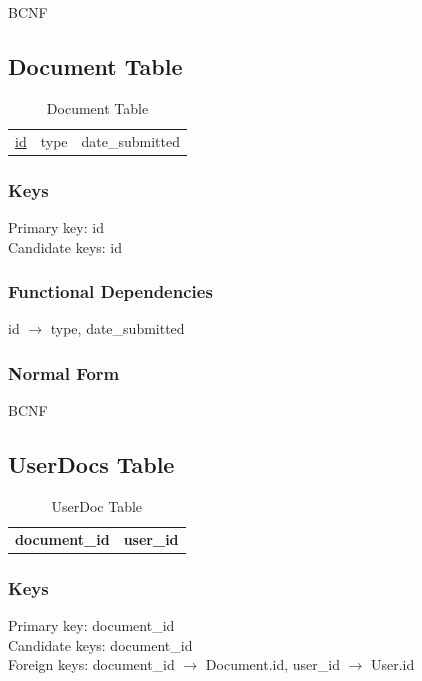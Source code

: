 \documentclass[11pt]{article}
\begin{document}
    BCNF
\subsection{Document Table}
\label{sec-3-8}


\begin{table}[htb]
\caption{Document Table} 
\begin{center}
\begin{tabular}{l|l|l}
 \underline{id}  &  type  &  date\_submitted  \\
\end{tabular}
\end{center}
\end{table}
\subsubsection{Keys}
\label{sec-3-8-1}

    
    Primary key: id\\
    Candidate keys: id
\subsubsection{Functional Dependencies}
\label{sec-3-8-2}


    id $\rightarrow$ type, date\_submitted
\subsubsection{Normal Form}
\label{sec-3-8-3}


    BCNF 
\subsection{UserDocs Table}
\label{sec-3-9}


\begin{table}[htb]
\caption{UserDoc Table} 
\begin{center}
\begin{tabular}{l|l}
 \textbf{document\_id}  &  \textbf{user\_id}  \\
\end{tabular}
\end{center}
\end{table}
\subsubsection{Keys}
\label{sec-3-9-1}

    
    Primary key: document\_id\\
    Candidate keys: document\_id\\
    Foreign keys: document\_id $\rightarrow$ Document.id, user\_id $\rightarrow$ User.id
\end{document}

